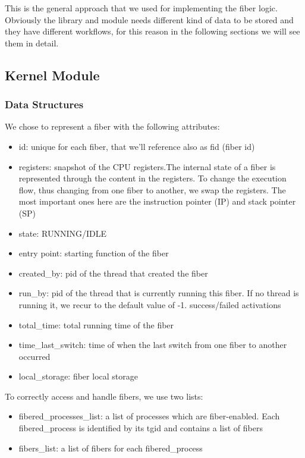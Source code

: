\documentclass[a4paper,10pt]{article}
\begin{document}
This is the general approach that we used for implementing the fiber logic. Obviously the library and module needs different kind of data to be stored and they have different workflows, for this reason in the following sections we will see them in detail.

\subsection{Kernel Module}
\subsubsection{Data Structures}
We chose to represent a fiber with the following attributes:
\begin{itemize}
	\item id: unique for each fiber, that we’ll reference also as fid (fiber id)
	\item registers: snapshot of the CPU registers.The internal state of a fiber is represented through the content in the registers. To change the execution flow, thus changing from one fiber to another, we swap the registers. The most important ones here are the instruction pointer (IP) and stack pointer (SP)
	\item state: RUNNING/IDLE
	\item entry point: starting function of the fiber
	\item created\_by: pid of the thread that created the fiber
	\item run\_by: pid of the thread that is currently running this fiber. If no thread is running it, we recur to the default value of -1.
	      success/failed activations
	\item total\_time: total running time of the fiber
	\item time\_last\_switch: time of when the last switch from one fiber to another occurred
	\item local\_storage: fiber local storage
\end{itemize}

To correctly access and handle fibers, we use two lists:
\begin{itemize}
	\item fibered\_processes\_list: a list of processes which are fiber-enabled. Each fibered\_process is identified by its tgid and contains a list of fibers
	\item fibers\_list: a list of fibers for each fibered\_process
\end{itemize}
\end{document}
